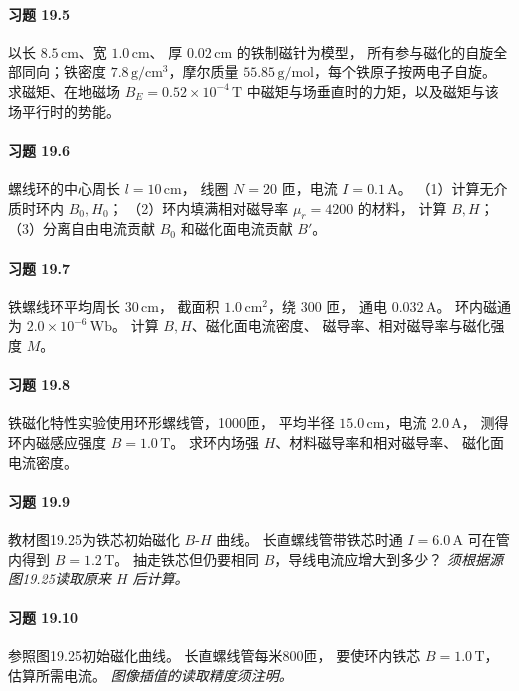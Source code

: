 \paragraph{习题 19.5}
以长 \(8.5\,\mathrm{cm}\)、宽 \(1.0\,\mathrm{cm}\)、
厚 \(0.02\,\mathrm{cm}\) 的铁制磁针为模型，
所有参与磁化的自旋全部同向；铁密度
\(7.8\,\mathrm{g/cm^3}\)，摩尔质量
\(55.85\,\mathrm{g/mol}\)，每个铁原子按两电子自旋。
求磁矩、在地磁场
\(B_E=0.52\times10^{-4}\,\mathrm T\)
中磁矩与场垂直时的力矩，以及磁矩与该场平行时的势能。

\paragraph{习题 19.6}
螺线环的中心周长 \(l=10\,\mathrm{cm}\)，
线圈 \(N=20\) 匝，电流 \(I=0.1\,\mathrm A\)。
（1）计算无介质时环内 \(B_0,H_0\)；
（2）环内填满相对磁导率 \(\mu_r=4200\) 的材料，
计算 \(B,H\)；（3）分离自由电流贡献 \(B_0\)
和磁化面电流贡献 \(B'\)。

\paragraph{习题 19.7}
铁螺线环平均周长 \(30\,\mathrm{cm}\)，
截面积 \(1.0\,\mathrm{cm^2}\)，绕 \(300\) 匝，
通电 \(0.032\,\mathrm A\)。
环内磁通为 \(2.0\times10^{-6}\,\mathrm{Wb}\)。
计算 \(B,H\)、磁化面电流密度、
磁导率、相对磁导率与磁化强度 \(M\)。

\paragraph{习题 19.8}
铁磁化特性实验使用环形螺线管，1000匝，
平均半径 \(15.0\,\mathrm{cm}\)，电流 \(2.0\,\mathrm A\)，
测得环内磁感应强度 \(B=1.0\,\mathrm T\)。
求环内场强 \(H\)、材料磁导率和相对磁导率、
磁化面电流密度。

\paragraph{习题 19.9}
教材图19.25为铁芯初始磁化 \(B\)-\(H\) 曲线。
长直螺线管带铁芯时通 \(I=6.0\,\mathrm A\)
可在管内得到 \(B=1.2\,\mathrm T\)。
抽走铁芯但仍要相同 \(B\)，导线电流应增大到多少？
\textit{须根据源图19.25读取原来 \(H\) 后计算。}

\paragraph{习题 19.10}
参照图19.25初始磁化曲线。
长直螺线管每米800匝，
要使环内铁芯 \(B=1.0\,\mathrm T\)，
估算所需电流。
\textit{图像插值的读取精度须注明。}

